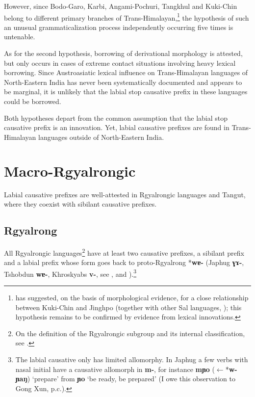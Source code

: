 \documentclass[oneside,a4paper,11pt]{article}
\newcommand{\ipa}[1]{\textbf{{\phon\mbox{#1}}}} %
\newcommand{\forme}[2]{\ipa{#1} `#2'}
\begin{document}
However, since  Bodo-Garo, Karbi, Angami-Pochuri, Tangkhul and Kuki-Chin belong to different primary branches of Trans-Himalayan,\footnote{\citet{delancey15central} has suggested, on the basis of morphological evidence, for a close relationship between Kuki-Chin and Jinghpo (together with other Sal languages, \citealt{burling83sal}); this hypothesis remains to be confirmed by evidence from lexical innovations.} the hypothesis of such an unusual grammaticalization process independently occurring five times is untenable.

As for the second hypothesis, borrowing of derivational morphology is attested, but only occurs in cases of extreme contact situations involving heavy lexical borrowing. Since Austroasiatic lexical influence on Trans-Himalayan languages of North-Eastern India has never been systematically documented and appears to be marginal, it is unlikely that the labial stop causative prefix in these languages could be borrowed.

Both hypotheses depart from the common assumption that the labial stop causative prefix is an innovation. Yet, labial causative prefixes are found in Trans-Himalayan languages outside of North-Eastern India. 

\section{Macro-Rgyalrongic}
Labial causative prefixes are well-attested in Rgyalrongic languages and Tangut, where they coexist with sibilant causative prefixes.

\subsection{Rgyalrong} \label{sec:japhug}
All Rgyalrongic languages\footnote{On the definition of the Rgyalrongic subgroup and its internal classification, see \citet{jackson00sidaba, jackson00puxi, jacques14esquisse, lai15person}.} have at least two causative prefixes, a sibilant prefix and a labial prefix whose form goes back to proto-Rgyalrong *\ipa{wɐ-} (Japhug \ipa{ɣɤ-}, Tshobdun \ipa{wɐ-}, Khroskyabs \ipa{v-}, see \citealt[322]{jacques04these}, \citealt{jackson06paisheng} and \citealt[136]{lai13affixale}).\footnote{The labial causative only has limited allomorphy. In Japhug a few verbs with nasal initial have a causative allomorph in \ipa{m-}, for instance \ipa{mɲo} ($\leftarrow$*\ipa{w-ɲaŋ}) `prepare' from \forme{ɲo}{be ready, be prepared} (I owe this observation to Gong Xun, p.c.).}
\end{document}
